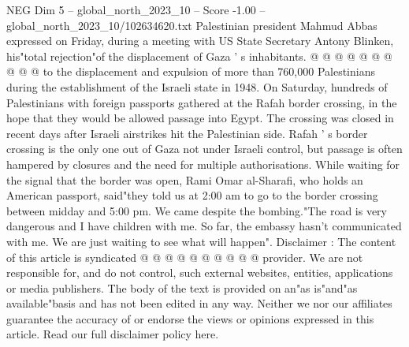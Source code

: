 \begin{textsample}{NEG Dim 5 – global\_north\_2023\_10 – Score -1.00 – global\_north\_2023\_10/102634620.txt}
Palestinian president Mahmud Abbas expressed on Friday, during a meeting with US State Secretary Antony Blinken, his"total rejection"of the displacement of Gaza ' s inhabitants. @ @ @ @ @ @ @ @ @ @ to the displacement and expulsion of more than 760,000 Palestinians during the establishment of the Israeli state in 1948.
On Saturday, hundreds of Palestinians with foreign passports gathered at the Rafah border crossing, in the hope that they would be allowed passage into Egypt.
The crossing was closed in recent days after Israeli airstrikes hit the Palestinian side.
Rafah ' s border crossing is the only one out of Gaza not under Israeli control, but passage is often hampered by closures and the need for multiple authorisations.
While waiting for the signal that the border was open, Rami Omar al-Sharafi, who holds an American passport, said"they told us at 2:00 am to go to the border crossing between midday and 5:00 pm.
We came despite the bombing."The road is very dangerous and I have children with me.
So far, the embassy hasn't communicated with me.
We are just waiting to see what will happen".
Disclaimer : The content of this article is syndicated @ @ @ @ @ @ @ @ @ @ provider.
We are not responsible for, and do not control, such external websites, entities, applications or media publishers.
The body of the text is provided on an"as is"and"as available"basis and has not been edited in any way.
Neither we nor our affiliates guarantee the accuracy of or endorse the views or opinions expressed in this article.
Read our full disclaimer policy here.

\end{textsample}
